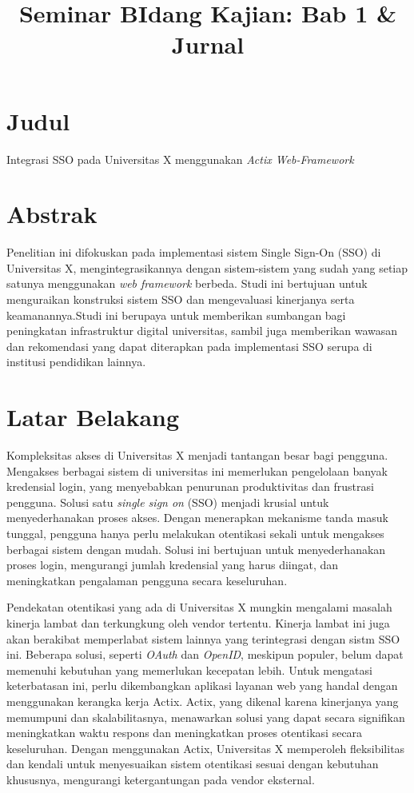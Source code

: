 \documentclass{article}
\title{Seminar BIdang Kajian: Bab 1 & Jurnal }
\begin{document}
\section*{Judul}
Integrasi SSO pada Universitas X menggunakan \emph{Actix Web-Framework}
\section{Abstrak}
Penelitian ini difokuskan pada implementasi sistem Single Sign-On (SSO) di Universitas X, mengintegrasikannya dengan sistem-sistem yang sudah yang setiap satunya menggunakan \emph{web framework} berbeda. Studi ini bertujuan untuk menguraikan konstruksi sistem SSO dan mengevaluasi kinerjanya serta keamanannya.Studi ini berupaya untuk memberikan sumbangan bagi peningkatan infrastruktur digital universitas, sambil juga memberikan wawasan dan rekomendasi yang dapat diterapkan pada implementasi SSO serupa di institusi pendidikan lainnya.

\section{Latar Belakang}

Kompleksitas akses di Universitas X menjadi tantangan besar bagi pengguna. Mengakses berbagai sistem di universitas ini memerlukan pengelolaan banyak kredensial login, yang menyebabkan penurunan produktivitas dan frustrasi pengguna. Solusi satu \emph{single sign on} (SSO) menjadi krusial untuk menyederhanakan proses akses. Dengan menerapkan mekanisme tanda masuk tunggal, pengguna hanya perlu melakukan otentikasi sekali untuk mengakses berbagai sistem dengan mudah. Solusi ini bertujuan untuk menyederhanakan proses login, mengurangi jumlah kredensial yang harus diingat, dan meningkatkan pengalaman pengguna secara keseluruhan.

Pendekatan otentikasi yang ada di Universitas X mungkin mengalami masalah kinerja lambat dan terkungkung oleh vendor tertentu. Kinerja lambat ini juga akan berakibat memperlabat sistem lainnya yang terintegrasi dengan  sistm SSO ini. Beberapa solusi, seperti \emph{OAuth} dan \emph{OpenID}, meskipun populer, belum dapat memenuhi kebutuhan yang memerlukan kecepatan lebih. Untuk mengatasi keterbatasan ini, perlu dikembangkan aplikasi layanan web yang handal dengan menggunakan kerangka kerja Actix. Actix, yang dikenal karena kinerjanya yang memumpuni dan skalabilitasnya, menawarkan solusi yang dapat secara signifikan meningkatkan waktu respons dan meningkatkan proses otentikasi secara keseluruhan. Dengan menggunakan Actix, Universitas X memperoleh fleksibilitas dan kendali untuk menyesuaikan sistem otentikasi sesuai dengan kebutuhan khususnya, mengurangi ketergantungan pada vendor eksternal.
\end{document}

